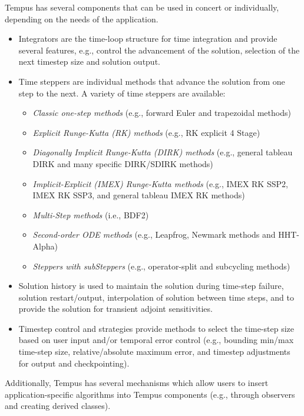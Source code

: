 Tempus has several components that can be used in concert or
individually, depending on the needs of the application.
\begin{itemize}
  \item Integrators are the time-loop structure for time integration
  and provide several features, e.g., control the advancement of
  the solution, selection of the next timestep size and solution
  output.

  \item Time steppers are individual methods that advance the
  solution from one step to the next.  A variety of time steppers
  are available:
  \begin{itemize}
    \item \emph{Classic one-step methods} (e.g., forward Euler and trapezoidal methods)
    \item \emph{Explicit Runge-Kutta (RK) methods} (e.g., RK explicit 4 Stage)
    \item \emph{Diagonally Implicit Runge-Kutta (DIRK) methods} (e.g.,
    general tableau DIRK and many specific DIRK/SDIRK methods)
    \item \emph{Implicit-Explicit (IMEX) Runge-Kutta methods} (e.g., IMEX
    RK SSP2, IMEX RK SSP3, and general tableau IMEX RK methods)
    \item \emph{Multi-Step methods} (i.e., BDF2)
    \item \emph{Second-order ODE methods} (e.g., Leapfrog, Newmark methods
    and HHT-Alpha)
    \item \emph{Steppers with subSteppers} (e.g., operator-split and
    subcycling methods)
  \end{itemize}

  \item Solution history is used to maintain the solution during
  time-step failure, solution restart/output, interpolation of
  solution between time steps, and to provide the solution for
  transient adjoint sensitivities.

  \item Timestep control and strategies provide methods to select
  the time-step size based on user input and/or temporal error
  control (e.g., bounding min/max time-step size, relative/absolute
  maximum error, and timestep adjustments for output and checkpointing).
\end{itemize}

Additionally, Tempus has several mechanisms which allow users to
insert application-specific algorithms into Tempus components (e.g.,
through observers and creating derived classes).

